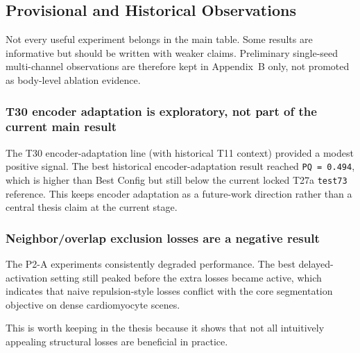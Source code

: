 \subsection{Provisional and Historical Observations}\label{provisional-and-historical-observations}

Not every useful experiment belongs in the main table. Some results are informative but should be written with weaker claims. Preliminary single-seed multi-channel observations are therefore kept in Appendix~B only, not promoted as body-level ablation evidence.

\subsubsection{T30 encoder adaptation is exploratory, not part of the current main result}\label{t30-encoder-adaptation-is-exploratory-not-part-of-the-current-main-result}

The T30 encoder-adaptation line (with historical T11 context) provided a modest positive signal. The best historical encoder-adaptation result reached \texttt{PQ\ =\ 0.494}, which is higher than Best Config but still below the current locked T27a \texttt{test73} reference. This keeps encoder adaptation as a future-work direction rather than a central thesis claim at the current stage.

\subsubsection{Neighbor/overlap exclusion losses are a negative result}\label{neighboroverlap-exclusion-losses-are-a-negative-result}

The P2-A experiments consistently degraded performance. The best delayed-activation setting still peaked before the extra losses became active, which indicates that naive repulsion-style losses conflict with the core segmentation objective on dense cardiomyocyte scenes.

This is worth keeping in the thesis because it shows that not all intuitively appealing structural losses are beneficial in practice.
